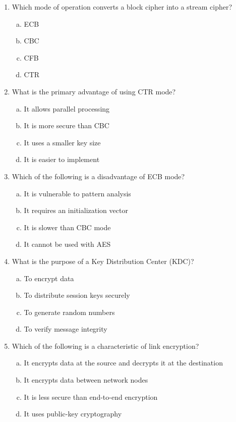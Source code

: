 \documentclass[12pt]{article}
\begin{document}
\begin{enumerate}
    \item Which mode of operation converts a block cipher into a stream cipher?
    \begin{enumerate}[(a)]
        \item ECB
        \item CBC
        \item CFB
        \item CTR
    \end{enumerate}

    \item What is the primary advantage of using CTR mode?
    \begin{enumerate}[(a)]
        \item It allows parallel processing
        \item It is more secure than CBC
        \item It uses a smaller key size
        \item It is easier to implement
    \end{enumerate}

    \item Which of the following is a disadvantage of ECB mode?
    \begin{enumerate}[(a)]
        \item It is vulnerable to pattern analysis
        \item It requires an initialization vector
        \item It is slower than CBC mode
        \item It cannot be used with AES
    \end{enumerate}

    \item What is the purpose of a Key Distribution Center (KDC)?
    \begin{enumerate}[(a)]
        \item To encrypt data
        \item To distribute session keys securely
        \item To generate random numbers
        \item To verify message integrity
    \end{enumerate}
\newpage
    \item Which of the following is a characteristic of link encryption?
    \begin{enumerate}[(a)]
        \item It encrypts data at the source and decrypts it at the destination
        \item It encrypts data between network nodes
        \item It is less secure than end-to-end encryption
        \item It uses public-key cryptography
    \end{enumerate}


\end{enumerate}
\end{document}
